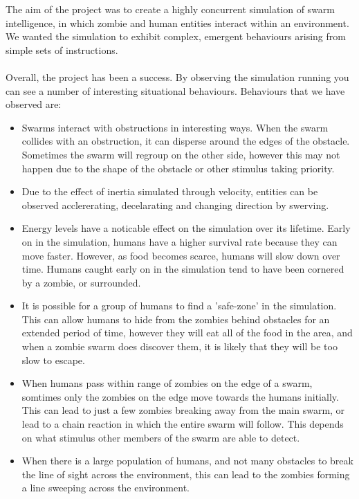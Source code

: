 \documentclass[10pt, a4paper, conference, compsocconf]{IEEEtran}
\begin{document}
The aim of the project was to create a highly concurrent simulation of swarm intelligence, in which zombie and human entities interact within an environment. We wanted the simulation to exhibit complex, emergent behaviours arising from simple sets of instructions.\\
\\
Overall, the project has been a success. By observing the simulation running you can see a number of interesting situational behaviours. Behaviours that we have observed are:
\begin{itemize}
    \item Swarms interact with obstructions in interesting ways. When the swarm collides with an obstruction, it can disperse around the edges of the obstacle. Sometimes the swarm will regroup on the other side, however this may not happen due to the shape of the obstacle or other stimulus taking priority.
    \item Due to the effect of inertia simulated through velocity, entities can be observed acclererating, decelarating and changing direction by swerving. \item Energy levels have a noticable effect on the simulation over its lifetime. Early on in the simulation, humans have a higher survival rate because they can move faster. However, as food becomes scarce, humans will slow down over time. Humans caught early on in the simulation tend to have been cornered by a zombie, or surrounded.
    \item It is possible for a group of humans to find a 'safe-zone' in the simulation. This can allow humans to hide from the zombies behind obstacles  for an extended period of time, however they will eat all of the food in the area, and when a zombie swarm does discover them, it is likely that they will be too slow to escape.
    \item When humans pass within range of zombies on the edge of a swarm, somtimes only the zombies on the edge move towards the humans initially. This can lead to just a few zombies breaking away from the main swarm, or lead to a chain reaction in which the entire swarm will follow. This depends on what stimulus other members of the swarm are able to detect.
    \item When there is a large population of humans, and not many obstacles to break the line of sight across the environment, this can lead to the zombies forming a line sweeping across the environment.
\end{itemize}
\end{document}
